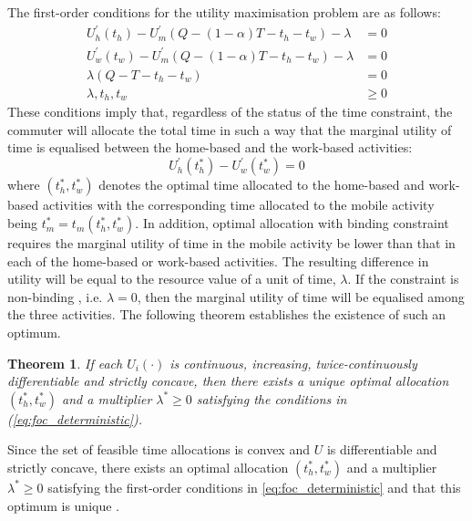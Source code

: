 \documentclass[12pt,a4paper,british]{article}
\makeatletter
\newenvironment{proof}[1][\proofname]{\par
    \normalfont\topsep6\p@\@plus6\p@\relax
    \trivlist
    \itemindent\parindent
    \item[\hskip\labelsep
          \scshape
      #1]\ignorespaces
  }{%
    \endtrivlist\@endpefalse
  }
\providecommand{\proofname}{Proof}
\newtheorem{theorem}{Theorem}[section]
\makeatother
\begin{document}

The first-order conditions for the utility maximisation problem are as follows:
\begin{equation}
\begin{aligned}
U_{h}^{\prime}\left(t_{h}\right)-U_{m}^{\prime}\left(Q-\left(1-\alpha\right)T-t_{h}-t_{w}\right)-\lambda & =0\\
U_{w}^{\prime}\left(t_{w}\right)-U_{m}^{\prime}\left(Q-\left(1-\alpha\right)T-t_{h}-t_{w}\right)-\lambda & =0\\
\lambda\left(Q-T-t_{h}-t_{w}\right) & =0\\
\lambda,t_{h},t_{w} & \geq0
\end{aligned}
\label{eq:foc_deterministic}
\end{equation}
These conditions imply that, regardless of the status of the time constraint, the commuter will allocate the total time in such a way that the marginal utility of time is equalised between the home-based and the work-based activities:%
\begin{equation}
U_{h}^{\prime}\left(t_{h}^{\ast}\right)-U_{w}^{\prime}\left(t_{w}^{\ast}\right)=0\label{eq:Uh_eq_Uw}
\end{equation}%
where $\left(t_{h}^{\ast},t_{w}^{\ast}\right)$ denotes the optimal time allocated to the home-based and work-based activities with the corresponding time allocated to the mobile activity being $t_{m}^{\ast}=t_{m}\left(t_{h}^{\ast},t_{w}^{\ast}\right)$. In addition, optimal allocation with binding constraint requires the marginal utility of time in the mobile activity be lower than that in each of the home-based or work-based activities. The resulting difference in utility will be equal to the resource value of a unit of time, $\lambda$. If the constraint is non-binding , i.e. $\lambda=0$, then the marginal utility of time will be equalised among the three activities. The following theorem establishes the existence of such an optimum.

\begin{theorem}
If each $U_{i}\left(\cdot\right)$ is continuous, increasing, twice-continuously differentiable and strictly concave, then there exists a unique optimal allocation $\left(t_{h}^{\ast},t_{w}^{\ast}\right)$ and a multiplier \textup{$\lambda^{\ast}\geq0$} satisfying the conditions in (\ref{eq:foc_deterministic}).
\end{theorem}

\begin{proof} 
Since the set of feasible time allocations is convex and $U$ is differentiable and strictly concave, there exists an optimal allocation  $\left(t_{h}^{\ast},t_{w}^{\ast}\right)$ and a multiplier $\lambda^{\ast} \geq 0$ satisfying the first-order conditions in \eqref{eq:foc_deterministic} and that this optimum is unique \citep[Theorem 1.19 and Theorem 1.20 in][]{delaFonte_mathematical_2000}.
\end{proof}
\end{document}

